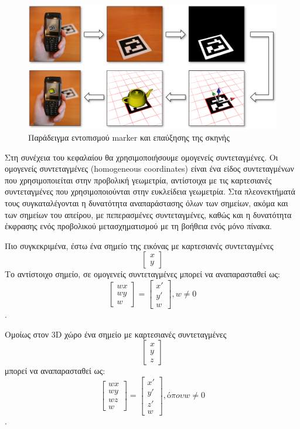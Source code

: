 \begin{figure}[H]
    \centering
    \includegraphics[scale=0.6, angle=0]{Files/Figures/HowMarkersWork.jpg}
    \caption[Παράδειγμα εντοπισμού marker και επαύξησης της σκηνής \cite{howmarkerswork}]{ Παράδειγμα εντοπισμού marker και επαύξησης της σκηνής \cite{howmarkerswork}}
    \label{fig:howmarkerswork}
\end{figure}


Στη συνέχεια του κεφαλαίου θα χρησιμοποιήσουμε ομογενείς συντεταγμένες. Οι ομογενείς συντεταγμένες (homogeneous coordinates) είναι ένα είδος συντεταγμένων που χρησιμοποιείται στην προβολική γεωμετρία, αντίστοιχα με τις καρτεσιανές συντεταγμένες που χρησιμοποιούνται στην ευκλείδεια γεωμετρία. Στα πλεονεκτήματά τους συγκαταλέγονται η δυνατότητα αναπαράστασης όλων των σημείων, ακόμα και των σημείων του απείρου, με πεπερασμένες συντεταγμένες, καθώς και η δυνατότητα έκφρασης ενός προβολικού μετασχηματισμού με τη βοήθεια ενός μόνο πίνακα.

Πιο συγκεκριμένα, έστω ένα σημείο της εικόνας με καρτεσιανές συντεταγμένες \[\begin{bmatrix} x \\ y \end{bmatrix}\]
Το αντίστοιχο σημείο, σε ομογενείς συντεταγμένες μπορεί να αναπαρασταθεί ως: \[\begin{bmatrix} wx \\ wy \\ w\end{bmatrix}=
\begin{bmatrix}x'\\y'\\w\end{bmatrix} , w\neq0 \].

Ομοίως στον 3D χώρο ένα σημείο με καρτεσιανές συντεταγμένες \[\begin{bmatrix} x \\ y \\ z \end{bmatrix}\] μπορεί να αναπαρασταθεί ως: \[\begin{bmatrix} wx \\ wy \\ wz \\ w\end{bmatrix}=
\begin{bmatrix}x'\\y'\\z' \\ w\end{bmatrix} , όπου w\neq0 \].


